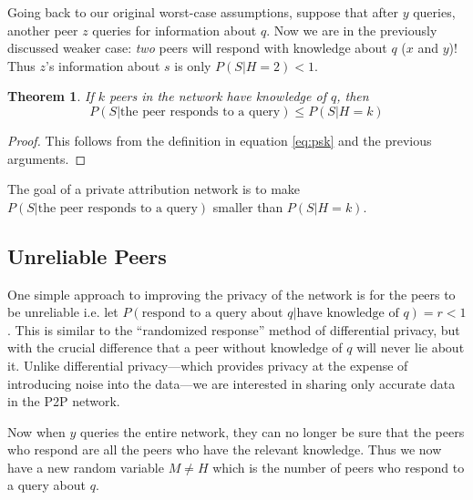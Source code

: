 \documentclass{article}
\newcommand{\eqnref}[1]{equation \eqref{eq:#1}}
\newtheorem{theorem}{Theorem}
\begin{document}
Going back to our original worst-case assumptions, suppose that after $y$
queries, another peer $z$ queries for information about $q$. Now we are in the
previously discussed weaker case: {\it two} peers will respond with knowledge
about $q$ ($x$ and $y$)! Thus $z$'s information about $s$ is only $P(S|H=2)<1$.

\begin{theorem}
	If $k$ peers in the network have knowledge of $q$, then
	\begin{equation*}
		P(S|\text{the peer responds to a query})\le P(S|H=k)
	\end{equation*}
\end{theorem}
\begin{proof}
	This follows from the definition in \eqnref{psk} and the previous arguments.
\end{proof}

The goal of a private attribution network is to make $P(S|\text{the peer
responds to a query})$ smaller than $P(S|H=k)$.

\subsection{Unreliable Peers}\label{sec:unreliable}

One simple approach to improving the privacy of the network is for the peers to
be unreliable i.e. let $P(\text{respond to a query about }q|\text{have knowledge
of }q)=r<1$. This is similar to the ``randomized response'' method of
differential privacy\cite{randresps}, but with the crucial difference that a peer
without knowledge of $q$ will never lie about it. Unlike differential
privacy---which provides privacy at the expense of introducing noise into the
data---we are interested in sharing only accurate data in the P2P network.

Now when $y$ queries the entire network, they can no longer be sure
that the peers who respond are all the peers who have the relevant knowledge.
Thus we now have a new random variable $M\ne H$ which is the number of peers who
respond to a query about $q$.
\end{document}
